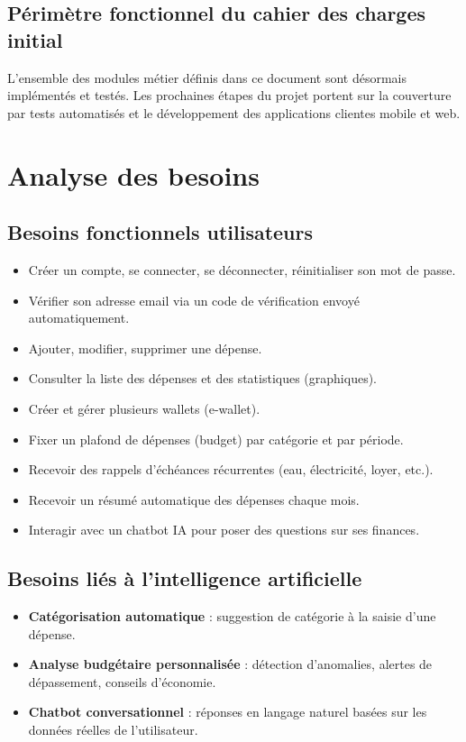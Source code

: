 \documentclass[11pt,a4paper]{article}
\begin{document}
\subsection{Périmètre fonctionnel du cahier des charges initial}
L'ensemble des modules métier définis dans ce document sont désormais implémentés et testés. Les prochaines étapes du projet portent sur la couverture par tests automatisés et le développement des applications clientes mobile et web.

\section{Analyse des besoins}

\subsection{Besoins fonctionnels utilisateurs}
\begin{itemize}[leftmargin=*]
    \item Créer un compte, se connecter, se déconnecter, réinitialiser son mot de passe.
    \item Vérifier son adresse email via un code de vérification envoyé automatiquement.
    \item Ajouter, modifier, supprimer une dépense.
    \item Consulter la liste des dépenses et des statistiques (graphiques).
    \item Créer et gérer plusieurs wallets (e-wallet).
    \item Fixer un plafond de dépenses (budget) par catégorie et par période.
    \item Recevoir des rappels d'échéances récurrentes (eau, électricité, loyer, etc.).
    \item Recevoir un résumé automatique des dépenses chaque mois.
    \item Interagir avec un chatbot IA pour poser des questions sur ses finances.
\end{itemize}

\subsection{Besoins liés à l'intelligence artificielle}
\begin{itemize}[leftmargin=*]
    \item \textbf{Catégorisation automatique} : suggestion de catégorie à la saisie d'une dépense.
    \item \textbf{Analyse budgétaire personnalisée} : détection d'anomalies, alertes de dépassement, conseils d'économie.
    \item \textbf{Chatbot conversationnel} : réponses en langage naturel basées sur les données réelles de l'utilisateur.
\end{itemize}
\end{document}
